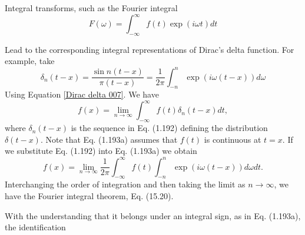 Integral transforms, such as the Fourier integral
\begin{equation}
F(\omega)=\int_{-\infty}^{\infty} f(t) \exp (i \omega t) d t
\end{equation}

Lead to the corresponding integral representations of Dirac's delta function. For example, take
\begin{equation}
\delta_{n}(t-x)=\frac{\sin n(t-x)}{\pi(t-x)}=\frac{1}{2 \pi} \int_{-n}^{n} \exp (i \omega(t-x)) d \omega \label{Dirac delta 007}
\end{equation}
Using Equation \ref{Dirac delta 007}. We have
$$
f(x)=\lim _{n \rightarrow \infty} \int_{-\infty}^{\infty} f(t) \delta_{n}(t-x) d t,
$$
where $\delta_{n}(t-x)$ is the sequence in Eq. (1.192) defining the distribution $\delta(t-x)$. Note that Eq. (1.193a) assumes that $f(t)$ is continuous at $t=x$. If we substitute Eq. (1.192) into Eq. (1.193a) we obtain
$$
f(x)=\lim _{n \rightarrow \infty} \frac{1}{2 \pi} \int_{-\infty}^{\infty} f(t) \int_{-n}^{n} \exp (i \omega(t-x)) d \omega d t .
$$
Interchanging the order of integration and then taking the limit as $n \rightarrow \infty$, we have the Fourier integral theorem, Eq. (15.20).

With the understanding that it belongs under an integral sign, as in Eq. (1.193a), the identification